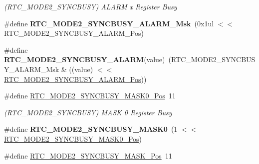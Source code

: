 \begin{DoxyCompactItemize}
\begin{DoxyCompactList}\small\item\em (R\+T\+C\+\_\+\+M\+O\+D\+E2\+\_\+\+S\+Y\+N\+C\+B\+U\+S\+Y) A\+L\+A\+R\+M x Register Busy \end{DoxyCompactList}\item 
\hypertarget{group___s_a_m_l21___r_t_c_ga011a298116143375f56f65829bf0c14b}{}\#define {\bfseries R\+T\+C\+\_\+\+M\+O\+D\+E2\+\_\+\+S\+Y\+N\+C\+B\+U\+S\+Y\+\_\+\+A\+L\+A\+R\+M\+\_\+\+Msk}~(0x1ul $<$$<$ R\+T\+C\+\_\+\+M\+O\+D\+E2\+\_\+\+S\+Y\+N\+C\+B\+U\+S\+Y\+\_\+\+A\+L\+A\+R\+M\+\_\+\+Pos)\label{group___s_a_m_l21___r_t_c_ga011a298116143375f56f65829bf0c14b}

\item 
\hypertarget{group___s_a_m_l21___r_t_c_gac6c4960511752b88b5f9847fa4b881d9}{}\#define {\bfseries R\+T\+C\+\_\+\+M\+O\+D\+E2\+\_\+\+S\+Y\+N\+C\+B\+U\+S\+Y\+\_\+\+A\+L\+A\+R\+M}(value)~(R\+T\+C\+\_\+\+M\+O\+D\+E2\+\_\+\+S\+Y\+N\+C\+B\+U\+S\+Y\+\_\+\+A\+L\+A\+R\+M\+\_\+\+Msk \& ((value) $<$$<$ \hyperlink{group___s_a_m_l21___r_t_c_ga203119d9c089d5879778b676012fc2bb}{R\+T\+C\+\_\+\+M\+O\+D\+E2\+\_\+\+S\+Y\+N\+C\+B\+U\+S\+Y\+\_\+\+A\+L\+A\+R\+M\+\_\+\+Pos}))\label{group___s_a_m_l21___r_t_c_gac6c4960511752b88b5f9847fa4b881d9}

\item 
\hypertarget{group___s_a_m_l21___r_t_c_ga0e6b21b876017e2b02b97917a9e0b2df}{}\#define \hyperlink{group___s_a_m_l21___r_t_c_ga0e6b21b876017e2b02b97917a9e0b2df}{R\+T\+C\+\_\+\+M\+O\+D\+E2\+\_\+\+S\+Y\+N\+C\+B\+U\+S\+Y\+\_\+\+M\+A\+S\+K0\+\_\+\+Pos}~11\label{group___s_a_m_l21___r_t_c_ga0e6b21b876017e2b02b97917a9e0b2df}

\begin{DoxyCompactList}\small\item\em (R\+T\+C\+\_\+\+M\+O\+D\+E2\+\_\+\+S\+Y\+N\+C\+B\+U\+S\+Y) M\+A\+S\+K 0 Register Busy \end{DoxyCompactList}\item 
\hypertarget{group___s_a_m_l21___r_t_c_ga851c6e2a68ef22c751f10ec6b498588c}{}\#define {\bfseries R\+T\+C\+\_\+\+M\+O\+D\+E2\+\_\+\+S\+Y\+N\+C\+B\+U\+S\+Y\+\_\+\+M\+A\+S\+K0}~(1 $<$$<$ \hyperlink{group___s_a_m_l21___r_t_c_ga0e6b21b876017e2b02b97917a9e0b2df}{R\+T\+C\+\_\+\+M\+O\+D\+E2\+\_\+\+S\+Y\+N\+C\+B\+U\+S\+Y\+\_\+\+M\+A\+S\+K0\+\_\+\+Pos})\label{group___s_a_m_l21___r_t_c_ga851c6e2a68ef22c751f10ec6b498588c}

\item 
\hypertarget{group___s_a_m_l21___r_t_c_ga30fef42c493c6bfa74c767dd98de3b50}{}\#define \hyperlink{group___s_a_m_l21___r_t_c_ga30fef42c493c6bfa74c767dd98de3b50}{R\+T\+C\+\_\+\+M\+O\+D\+E2\+\_\+\+S\+Y\+N\+C\+B\+U\+S\+Y\+\_\+\+M\+A\+S\+K\+\_\+\+Pos}~11\label{group___s_a_m_l21___r_t_c_ga30fef42c493c6bfa74c767dd98de3b50}


\end{DoxyCompactItemize}

